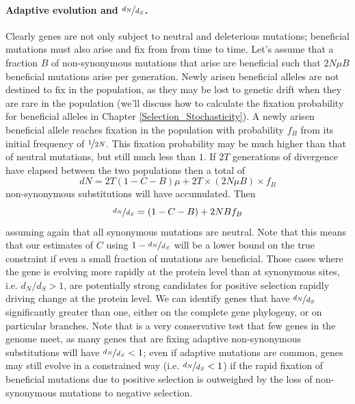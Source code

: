 \paragraph{Adaptive evolution and $\nicefrac{d_N}{d_S}$.}
Clearly genes are not only subject to neutral and deleterious mutations; beneficial mutations must also arise and fix from from time to time.
Let's assume that a fraction $B$ of non-synonymous mutations that arise are
beneficial such that $2 N \mu B$ beneficial mutations arise per generation. Newly arisen beneficial alleles are not destined to fix in the population, as they may be lost to genetic drift when they are rare in the population (we'll
discuss how to calculate the fixation probability for beneficial
alleles in Chapter \ref{Selection_Stochasticity}). A newly arisen beneficial allele reaches fixation in the population with probability $f_B$ from its initial frequency of $\nicefrac{1}{2N}$. This fixation
probability may be much higher than that of neutral mutations, but still much less than $1$.  If $2T$ generations of divergence have
elapsed between the two populations then a total of
\begin{equation}
dN=2T (1-C - B) \mu  + 2T \times (2 N \mu B) \times  f_B
\end{equation}
non-synonymous substitutions will have accumulated.
Then
\begin{equation}
\nicefrac{d_N}{d_S} = (1-C-B) +  2 N B f_B \label{eqn:dNDS_C_B}
\end{equation}
assuming again that all synonymous mutations are neutral. Note that this means that our estimates of $C$ using $1-\nicefrac{d_N}{d_S}$ will be
a  lower bound on the true constraint if even a small fraction of
mutations are beneficial. Those cases where the gene is evolving more rapidly at the protein level than at synonymous
sites, i.e. $d_N/d_S > 1$, are potentially strong candidates for  positive selection rapidly driving change at the protein level. We can identify genes that have $\nicefrac{d_N}{d_S}$ significantly greater than one, either on the complete gene phylogeny, or on particular branches. Note that is a very conservative test that few genes in the genome meet, as many genes that are fixing adaptive non-synonymous substitutions will have $\nicefrac{d_N}{d_S}<1$;  even if adaptive mutations are common, genes may still evolve in a constrained way (i.e. $\nicefrac{d_N}{d_S}<1$) if
the rapid fixation of beneficial mutations due to positive selection is outweighed by the loss of non-synonymous mutations to negative selection.


